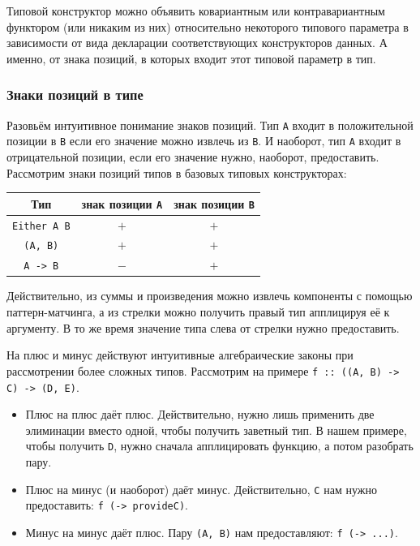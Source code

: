 Типовой конструктор можно объявить ковариантным или контравариантным функтором (или никаким из них) относительно некоторого типового параметра в зависимости от вида декларации соответствующих конструкторов данных.
А именно, от знака позиций, в которых входит этот типовой параметр в тип.

\subsubsection{Знаки позиций в типе}

Разовьём интуитивное понимание знаков позиций.
Тип \texttt{A} входит в положительной позиции в \texttt{B} если его значение можно извлечь из \texttt{B}.
И наоборот, тип \texttt{A} входит в отрицательной позиции, если его значение нужно, наоборот, предоставить.
Рассмотрим знаки позиций типов в базовых типовых конструкторах:
\begin{center}
    \begin{tabular}[h]{|c|c|c|}
        \hline
        Тип                              & знак позиции \texttt{A} & знак позиции \texttt{B} \\
        \hline
        \texttt{Either A B} & $+$                                  & $+$                                  \\
        \texttt{(A, B)}     & $+$                                  & $+$                                  \\
        \texttt{A -> B}     & $-$                                  & $+$                                  \\
        \hline
    \end{tabular}
\end{center}

Действительно, из суммы и произведения можно извлечь компоненты с помощью паттерн-матчинга, а из стрелки можно получить правый тип апплицируя её к аргументу.
В то же время значение типа слева от стрелки нужно предоставить.

На плюс и минус действуют интуитивные алгебраические законы при рассмотрении более сложных типов.
Рассмотрим на примере \texttt{f :: ((A, B) -> C) -> (D, E)}.
\begin{itemize}
    \item Плюс на плюс даёт плюс.
    Действительно, нужно лишь применить две элиминации вместо одной, чтобы получить заветный тип.
    В нашем примере, чтобы получить \texttt{D}, нужно сначала апплицировать функцию, а потом разобрать пару.
    \item Плюс на минус (и наоборот) даёт минус.
    Действительно, \texttt{C} нам нужно предоставить: \texttt{f (\ab -> provideC)}.
    \item Минус на минус даёт плюс.
    Пару \texttt{(A, B)} нам предоставляют: \texttt{f (\ab -> ...)}.
\end{itemize}

